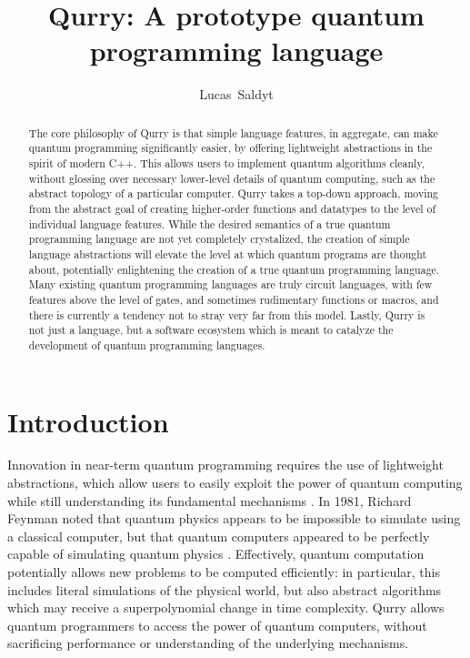 \documentclass[a4paper,twocolumn,11pt,accepted=2017-05-09]{quantumarticle}
\begin{document}
\title{Qurry: A prototype quantum programming language}

\author{Lucas~Saldyt}
\maketitle


\begin{abstract}
     The core philosophy of Qurry is that simple language features, in aggregate, can make quantum programming significantly easier, by offering lightweight abstractions in the spirit of modern C++.
    This allows users to implement quantum algorithms cleanly, without glossing over necessary lower-level details of quantum computing, such as the abstract topology of a particular computer.
    Qurry takes a top-down approach, moving from the abstract goal of creating higher-order functions and datatypes to the level of individual language features.
    While the desired semantics of a true quantum programming language are not yet completely crystalized, the creation of simple language abstractions will elevate the level at which quantum programs are thought about, potentially enlightening the creation of a true quantum programming language.
    Many existing quantum programming languages are truly circuit languages, with few features above the level of gates, and sometimes rudimentary functions or macros, and there is currently a tendency not to stray very far from this model.
    Lastly, Qurry is not just a language, but a software ecosystem which is meant to catalyze the development of quantum programming languages.
\end{abstract}

\section{Introduction}

Innovation in near-term quantum programming requires the use of lightweight abstractions, which allow users to easily exploit the power of quantum computing while still understanding its fundamental mechanisms \cite{stroustrup}.
In 1981, Richard Feynman noted that quantum physics appears to be impossible to simulate using a classical computer, but that quantum computers appeared to be perfectly capable of simulating quantum physics \cite{feynman_1981}.
Effectively, quantum computation potentially allows new problems to be computed efficiently: in particular, this includes literal simulations of the physical world, but also abstract algorithms which may receive a superpolynomial change in time complexity.
Qurry allows quantum programmers to access the power of quantum computers, without sacrificing performance or understanding of the underlying mechanisms.
\end{document}
